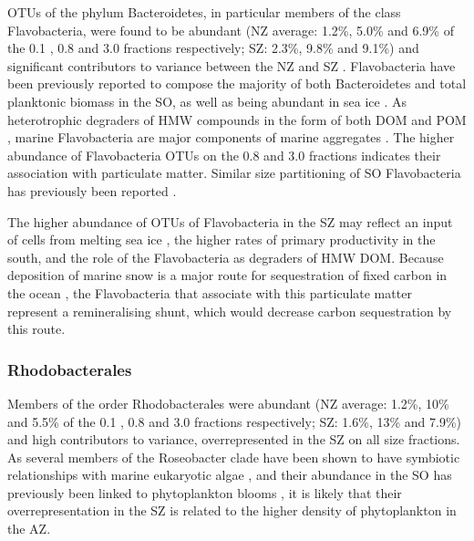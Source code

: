 \acp{OTU} of the phylum Bacteroidetes, in particular members of the class Flavobacteria, were found to be abundant (\ac{NZ} average: 1.2\%, 5.0\% and 6.9\% of the 0.1 \micron{}, 0.8 \micron{} and 3.0 \micron{} fractions respectively; SZ: 2.3\%, 9.8\% and 9.1\%) and significant contributors to variance between the \ac{NZ} and \ac{SZ} .
Flavobacteria have been previously reported to compose the majority of both Bacteroidetes \cite{Murray:2007db} and total planktonic biomass \cite{Abell:2005ji} in the \ac{SO}, as well as being abundant in sea ice \cite{Brown:2001hh}.
As heterotrophic degraders of \ac{HMW} compounds in the form of both \ac{DOM} and \ac{POM} \cite{Kirchman:2002ub}, marine Flavobacteria are major components of marine aggregates \cite{Rath:1998wm,Crump:1999wo,Zhang:2007fb}.
The higher abundance of Flavobacteria \acp{OTU} on the 0.8 \micron{} and 3.0 \micron{} fractions indicates their association with particulate matter.
Similar size partitioning of \ac{SO} Flavobacteria has previously been reported \cite{Abell:2005ji}.

The higher abundance of \acp{OTU} of Flavobacteria in the \ac{SZ} may reflect an input of cells from melting sea ice \cite{Brown:2001hh}, the higher rates of primary productivity in the south, and the role of the Flavobacteria as degraders of \ac{HMW} \ac{DOM}.
Because deposition of marine snow is a major route for sequestration of fixed carbon in the ocean \citep[e.g.][]{Hessen:2004vq}, the Flavobacteria that associate with this particulate matter represent a remineralising shunt, which would decrease carbon sequestration by this route.

\subsubsection{Rhodobacterales}

Members of the order Rhodobacterales were abundant (\ac{NZ} average: 1.2\%, 10\% and 5.5\% of the 0.1 \micron{}, 0.8 \micron{} and 3.0 \micron{} fractions respectively; \ac{SZ}: 1.6\%, 13\% and 7.9\%) and high contributors to variance, overrepresented in the \ac{SZ} on all size fractions.
As several members of the Roseobacter clade have been shown to have symbiotic relationships with marine eukaryotic algae \cite{Buchan:2005hd,WagnerDobler:2006kb}, and their abundance in the \ac{SO} has previously been linked to phytoplankton blooms \cite{West:2008kc,Obernosterer:2011df}, it is likely that their overrepresentation in the \ac{SZ} is related to the higher density of phytoplankton in the \ac{AZ}.

